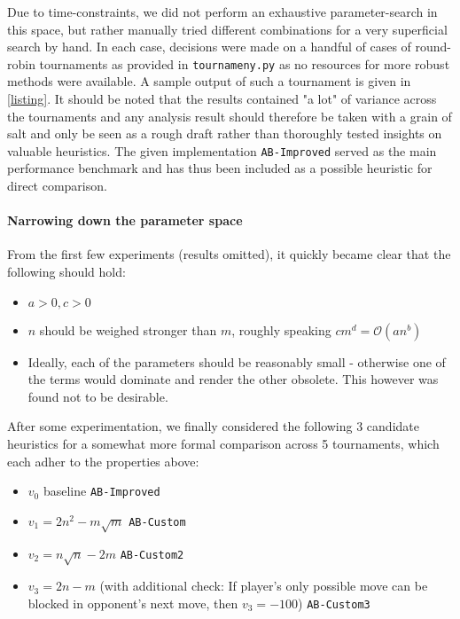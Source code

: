 \documentclass{article}
\theoremstyle{plain}
\theoremstyle{definition}
\theoremstyle{remark}
\begin{document}
Due to time-constraints, we did not perform an exhaustive parameter-search in this space, but rather manually tried different combinations for a very superficial search by hand. In each case, decisions were made on a handful of cases of round-robin tournaments as provided in \texttt{tournameny.py} as no resources for more robust methods were available. A sample output of such a tournament is given in \ref{listing}. It should be noted that the results contained "a lot" of variance across the tournaments and any analysis result should therefore be taken with a grain of salt and only be seen as a rough draft rather than thoroughly tested insights on valuable heuristics. The given implementation \texttt{AB-Improved} served as the main performance benchmark and has thus been included as a possible heuristic for direct comparison.



\paragraph{Narrowing down the parameter space}


From the first few experiments (results omitted), it quickly became clear that the following should hold:
\begin{itemize}
	\item $a>0, c>0$
	\item $n$ should be weighed stronger than $m$, roughly speaking $cm^d = \mathcal O(an^b)$
	\item Ideally, each of the parameters should be reasonably small - otherwise one of the terms would dominate and render the other obsolete. This however was found not to be desirable.
\end{itemize}


After some experimentation, we finally considered the following 3 candidate heuristics for a somewhat more formal comparison across 5 tournaments, which each adher to the properties above:
\begin{itemize}
	\item $v_0$ \qquad baseline \texttt{AB-Improved} 
	\item $v_1 = 2n^2 - m\sqrt m$ \qquad \texttt{AB-Custom} 
	\item $v_2 = n\sqrt n - 2m$  \qquad \texttt{AB-Custom2}
	\item $v_3 = 2n - m$ (with additional check: If player's only possible move can be blocked in opponent's next move, then $v_3=-100$) \qquad \texttt{AB-Custom3}
\end{itemize}
\end{document}

